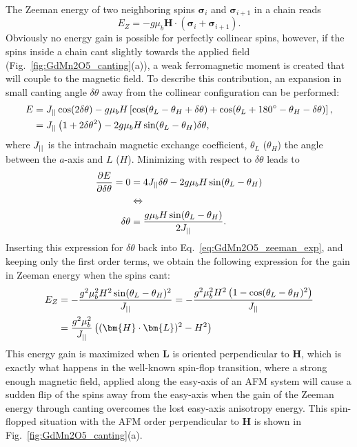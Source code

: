 The Zeeman energy of two neighboring spins $\pmb{\sigma}_{i}$ and $\pmb{\sigma}_{i+1}$ in a chain reads
\begin{equation}
	E_Z = -g \mu_b \bm{H} \cdot (\pmb{\sigma}_i + \pmb{\sigma}_{i+1})\nonumber.
\end{equation}
Obviously no energy gain is possible for perfectly collinear spins, however, if the spins inside a chain cant slightly towards the applied field (Fig.~\ref{fig:GdMn2O5_canting}(a)), a weak ferromagnetic moment is created that will couple to the magnetic field.
To describe this contribution, an expansion in small canting angle $\delta \theta$ away from the collinear configuration can be performed:
\begin{align}
	E &= J_{||} \cos(2\delta \theta) - g \mu_b H \left[\cos(\theta_L - \theta_H + \delta \theta) + \cos(\theta_L + 180^\circ - \theta_H - \delta \theta)\right],\nonumber\\
	&= J_{||} \left( 1+2\delta\theta^2 \right) - 2 g \mu_b H \sin(\theta_L - \theta_H)\delta\theta \label{eq:GdMn2O5_zeeman_exp},
\end{align}
where $J_{||}$ is the intrachain magnetic exchange coefficient, $\theta_L$ ($\theta_H$) the angle between the $a$-axis and $L$ ($H$).
Minimizing with respect to $\delta \theta$ leads to
\begin{align}
	\frac{\partial E}{\partial \delta \theta} = 0 &= 4 J_{||} \delta \theta - 2 g \mu_b H \sin(\theta_L - \theta_H) \nonumber\\
	&\Leftrightarrow \nonumber\\
	\delta \theta &= \frac{g\mu_b H \sin(\theta_L - \theta_H)}{2 J_{||}}.\nonumber
\end{align}
Inserting this expression for $\delta \theta$ back into Eq.~\ref{eq:GdMn2O5_zeeman_exp}, and keeping only the first order terms, we obtain the following expression for the gain in Zeeman energy when the spins cant:
\begin{align}
	E_Z &= -\frac{g^2\mu_b^2 H^2 \sin(\theta_L - \theta_H)^2}{\Jpar} = -\frac{g^2\mu_b^2 H^2 \left(1 - \cos(\theta_L - \theta_H)^2\right)}{\Jpar} \nonumber\\
	&=\frac{g^2\mu_b^2}{\Jpar}\left((\bm{H}\cdot\bm{L})^2 - H^2\right)\nonumber
\end{align}
This energy gain is maximized when $\bm{L}$ is oriented perpendicular to $\bm{H}$, which is exactly what happens in the well-known spin-flop transition, where a strong enough magnetic field, applied along the easy-axis of an AFM system will cause a sudden flip of the spins away from the easy-axis when the gain of the Zeeman energy through canting overcomes the lost easy-axis anisotropy energy. This spin-flopped situation with the AFM order perpendicular to $\bm{H}$ is shown in Fig.~\ref{fig:GdMn2O5_canting}(a).

